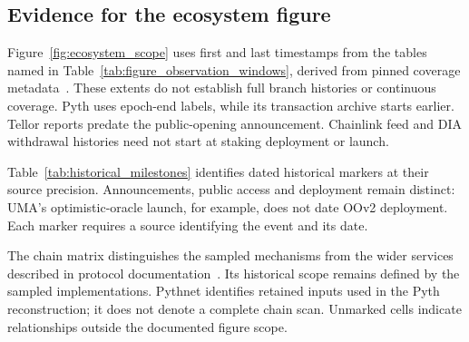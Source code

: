 

\subsection{Evidence for the ecosystem figure}
\label{app:ecosystem_evidence}
Figure~\ref{fig:ecosystem_scope} uses first and last timestamps from the tables named in Table~\ref{tab:figure_observation_windows}, derived from pinned coverage metadata~\cite{atlasScopeMetadata2026}. These extents do not establish full branch histories or continuous coverage. Pyth uses epoch-end labels, while its transaction archive starts earlier. Tellor reports predate the public-opening announcement. Chainlink feed and DIA withdrawal histories need not start at staking deployment or launch.



Table~\ref{tab:historical_milestones} identifies dated historical markers at their source precision. Announcements, public access and deployment remain distinct: UMA's optimistic-oracle launch, for example, does not date OOv2 deployment. Each marker requires a source identifying the event and its date.



The chain matrix distinguishes the sampled mechanisms from the wider services described in protocol documentation~\cite{uma2026,chainlinkstaking2026,tellorDisputes2026,flareFTSO2026,pythOIS2026,chronicleDocs2026,redstoneDocs2026,diaDocs2026}. Its historical scope remains defined by the sampled implementations. Pythnet identifies retained inputs used in the Pyth reconstruction; it does not denote a complete chain scan. Unmarked cells indicate relationships outside the documented figure scope.
